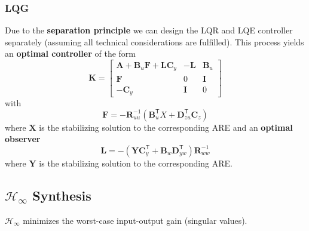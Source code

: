 \subsubsection{LQG}
Due to the \textbf{separation principle} we can design the LQR and LQE controller separately (assuming all technical considerations are fulfilled). This process yields an \textbf{optimal controller} of the form
\begin{equation*}
    \mathbf{K}=\left[\begin{array}{c|cc}%
            \mathbf{A}+\mathbf{B}_u \mathbf{F}+\mathbf{L}\mathbf{C}_y & -\mathbf{L} & \mathbf{B}_u \\
            \hline  %
            \mathbf{F}                                                & 0           & \mathbf{I}   \\
            -\mathbf{C}_y                                             & \mathbf{I}  & 0
        \end{array}\right]
\end{equation*}
with
\begin{equation*}
    \mathbf{F}=-\mathbf{R}_{uu}^{-1}(\mathbf{B}_{u}^{\mathsf{T}}X+\mathbf{D}_{zu}^{\mathsf{T}}\mathbf{C}_{z})
\end{equation*}
where $\mathbf{X}$ is the stabilizing solution to the corresponding ARE and an \textbf{optimal observer}
\begin{equation*}
    \mathbf{L}=-(\mathbf{Y}\mathbf{C}_y^{\mathsf{T}}+\mathbf{B}_w \mathbf{D}_{yw}^{\mathsf{T}})\mathbf{R}_{ww}^{-1}
\end{equation*}
where $\mathbf{Y}$ is the stabilizing solution to the corresponding ARE.


\subsection[H-infinity Synthesis]{$\mathcal{H}_\infty$ Synthesis}
$\mathcal{H}_\infty$ minimizes the worst-case input-output gain (singular values).

